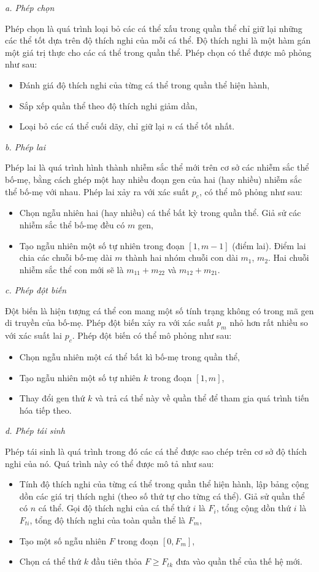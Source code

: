 \documentclass[12pt,a4paper]{report}
\begin{document}
\textit{a. Phép chọn}

Phép chọn là quá trình loại bỏ các cá thể xấu trong quần thể chỉ giữ lại những các thể tốt dựa trên độ thích nghi của mỗi cá thể. Độ thích nghi là một hàm gán một giá trị thực cho các cá thể trong quần thể. Phép chọn có thể được mô phỏng như sau:
	\begin{itemize}
		\item Đánh giá độ thích nghi của từng cá thể trong quần thể hiện hành,
		\item Sắp xếp quần thể theo độ thích nghi giảm dần,
		\item Loại bỏ các cá thể cuối dãy, chỉ giữ lại $n$ cá thể tốt nhất.
	\end{itemize}

\textit{b. Phép lai}

Phép lai là quá trình hình thành nhiễm sắc thể mới trên cơ sở các nhiễm sắc thể bố-mẹ, bằng cách ghép một hay nhiều đoạn gen của hai (hay nhiều) nhiễm sắc thể bố-mẹ với nhau. Phép lai xảy ra với xác suất $p_c$, có thể mô phỏng như sau:
	\begin{itemize}
		\item Chọn ngẫu nhiên hai (hay nhiều) cá thể bất kỳ trong quần thể. Giả sử các nhiễm sắc thể bố-mẹ đều có $m$ gen,
		\item Tạo ngẫu nhiên một số tự nhiên trong đoạn $[1, m-1]$ (điểm lai). Điểm lai chia các chuỗi bố-mẹ dài $m$ thành hai nhóm chuỗi con dài $m_1$, $m_2$. Hai chuỗi nhiễm sắc thể con mới sẽ là $m_{11} + m_{22}$ và $m_{12} + m_{21}$.
	\end{itemize}

\textit{c. Phép đột biến}

Đột biến là hiện tượng cá thể con mang một số tính trạng không có trong mã gen di truyền của bố-mẹ. Phép đột biến xảy ra với xác suất $p_m$ nhỏ hơn rất nhiều so với xác suất lai $p_c$. Phép đột biến có thể mô phỏng như sau:
	\begin{itemize}
		\item Chọn ngẫu nhiên một cá thể bất kì bố-mẹ trong quần thể,
		\item Tạo ngẫu nhiên một số tự nhiên $k$ trong đoạn $[1, m]$,
		\item Thay đổi gen thứ $k$ và trả cá thể này về quần thể để tham gia quá trình tiến hóa tiếp theo.
	\end{itemize}

\textit{d. Phép tái sinh}

Phép tái sinh là quá trình trong đó các cá thể được sao chép trên cơ sở độ thích nghi của nó. Quá trình này có thể được mô tả như sau:
	\begin{itemize}
		\item Tính độ thích nghi của từng cá thể trong quần thể hiện hành, lập bảng cộng dồn các giá trị thích nghi (theo số thứ tự cho từng cá thể). Giả sử quần thể có $n$ cá thể. Gọi độ thích nghi của cá thể thứ $i$ là $F_i$, tổng cộng dồn thứ $i$ là $F_{ti}$, tổng độ thích nghi của toàn quần thể là $F_{m}$,
		\item Tạo một số ngẫu nhiên $F$ trong đoạn $[0, F_m]$,
		\item Chọn cá thể thứ $k$ đầu tiên thỏa $F \geq F_{tk}$ đưa vào quần thể của thế hệ mới.
	\end{itemize}
\end{document}
